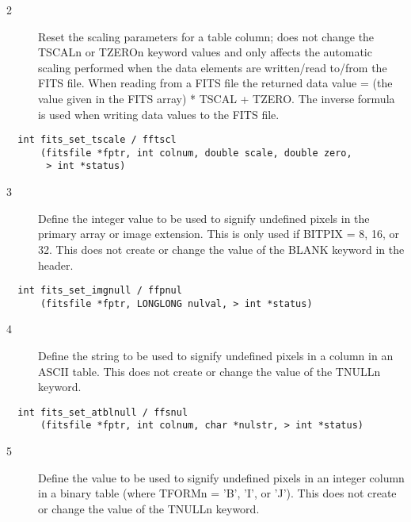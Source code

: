 \documentclass[11pt]{book}
\begin{document}
\begin{description}
\item[2 ] Reset the scaling parameters for a table column; does not change
    the TSCALn or TZEROn keyword values and only affects the automatic
    scaling performed when the data elements are written/read to/from
    the FITS file.  When reading from a FITS file the returned data
    value = (the value given in the FITS array) * TSCAL + TZERO.  The
    inverse formula is used when writing data values to the FITS file.
   \label{fftscl}
\end{description}

\begin{verbatim}
  int fits_set_tscale / fftscl
      (fitsfile *fptr, int colnum, double scale, double zero,
       > int *status)
\end{verbatim}

\begin{description}
\item[3 ] Define the integer value to be used to signify undefined pixels in the
    primary array or image extension.  This is only used if BITPIX = 8, 16,
    or 32.  This does not create or change the value of the BLANK keyword in
   the header. \label{ffpnul}
\end{description}

\begin{verbatim}
  int fits_set_imgnull / ffpnul
      (fitsfile *fptr, LONGLONG nulval, > int *status)
\end{verbatim}

\begin{description}
\item[4 ] Define the string to be used to signify undefined pixels in
    a column in an ASCII table.  This does not create or change the value
   of the TNULLn keyword. \label{ffsnul}
\end{description}

\begin{verbatim}
  int fits_set_atblnull / ffsnul
      (fitsfile *fptr, int colnum, char *nulstr, > int *status)
\end{verbatim}

\begin{description}
\item[5 ] Define the value to be used to signify undefined pixels in
    an integer column in a binary table (where TFORMn = 'B', 'I', or 'J').
    This does not create or  change the value of the TNULLn keyword.
   \label{fftnul}
\end{description}
\end{document}
